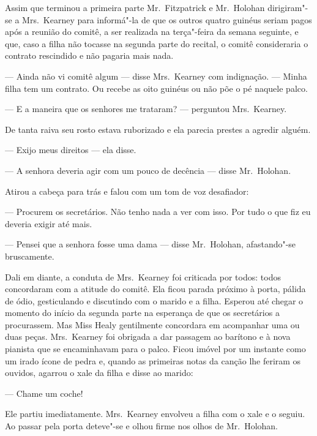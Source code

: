 Assim que terminou a primeira parte Mr.~Fitzpatrick e Mr.~Holohan dirigiram"-se
a Mrs.~Kearney para informá"-la de que os outros quatro guinéus seriam pagos
após a reunião do comitê, a ser realizada na terça"-feira da semana seguinte, e
que, caso a filha não tocasse na segunda parte do recital, o comitê
consideraria o contrato rescindido e não pagaria mais nada.

--- Ainda não vi comitê algum --- disse Mrs.~Kearney com indignação.  --- Minha
filha tem um contrato.  Ou recebe as oito guinéus ou não põe o pé naquele
palco.


--- E a maneira que os senhores me trataram? --- perguntou Mrs.~Kearney.

De tanta raiva seu rosto estava ruborizado e ela parecia prestes a agredir
alguém.

--- Exijo meus direitos --- ela disse.

--- A senhora deveria agir com um pouco de decência --- disse Mr.~Holohan.


Atirou a cabeça para trás e falou com um tom de voz desafiador:

--- Procurem os secretários.  Não tenho nada a ver com isso.  Por tudo o que
fiz eu deveria exigir até mais.

--- Pensei que a senhora fosse uma dama --- disse Mr.~Holohan, afastando"-se
bruscamente.

Dali em diante, a conduta de Mrs.~Kearney foi criticada por todos: todos
concordaram com a atitude do comitê.  Ela ficou parada próximo à porta, pálida
de ódio, gesticulando e discutindo com o marido e a filha.  Esperou até chegar
o momento do início da segunda parte na esperança de que os secretários a
procurassem.  Mas Miss Healy gentilmente concordara em acompanhar uma ou duas
peças.  Mrs.~Kearney foi obrigada a dar passagem ao barítono e à nova pianista
que se encaminhavam para o palco.  Ficou imóvel por um instante como um irado
ícone de pedra e, quando as primeiras notas da canção lhe feriram os ouvidos,
agarrou o xale da filha e disse ao marido:

--- Chame um coche!

Ele partiu imediatamente.  Mrs.~Kearney envolveu a filha com o xale e o seguiu.
Ao passar pela porta deteve"-se e olhou firme nos olhos de Mr.~Holohan.

